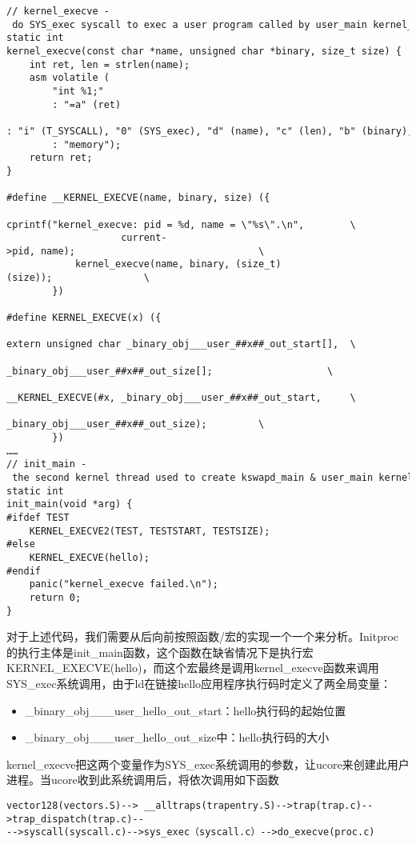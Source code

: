 \begin{lstlisting}
// kernel_execve - do SYS_exec syscall to exec a user program called by user_main kernel_thread
static int
kernel_execve(const char *name, unsigned char *binary, size_t size) {
    int ret, len = strlen(name);
    asm volatile (
        "int %1;"
        : "=a" (ret)
        : "i" (T_SYSCALL), "0" (SYS_exec), "d" (name), "c" (len), "b" (binary), "D" (size)
        : "memory");
    return ret;
}

#define __KERNEL_EXECVE(name, binary, size) ({                          \
            cprintf("kernel_execve: pid = %d, name = \"%s\".\n",        \
                    current->pid, name);                                \
            kernel_execve(name, binary, (size_t)(size));                \
        })

#define KERNEL_EXECVE(x) ({                                             \
            extern unsigned char _binary_obj___user_##x##_out_start[],  \
                _binary_obj___user_##x##_out_size[];                    \
            __KERNEL_EXECVE(#x, _binary_obj___user_##x##_out_start,     \
                            _binary_obj___user_##x##_out_size);         \
        })
……
// init_main - the second kernel thread used to create kswapd_main & user_main kernel threads
static int
init_main(void *arg) {
#ifdef TEST
    KERNEL_EXECVE2(TEST, TESTSTART, TESTSIZE);
#else
    KERNEL_EXECVE(hello);
#endif
    panic("kernel_execve failed.\n");
    return 0;
}
\end{lstlisting}

对于上述代码，我们需要从后向前按照函数/宏的实现一个一个来分析。Initproc的执行主体是init\_main函数，这个函数在缺省情况下是执行宏KERNEL\_EXECVE(hello)，而这个宏最终是调用kernel\_execve函数来调用SYS\_exec系统调用，由于ld在链接hello应用程序执行码时定义了两全局变量：

\begin{itemize}
\item
  \_binary\_obj\_\_\_user\_hello\_out\_start：hello执行码的起始位置
\item
  \_binary\_obj\_\_\_user\_hello\_out\_size中：hello执行码的大小
\end{itemize}

kernel\_execve把这两个变量作为SYS\_exec系统调用的参数，让ucore来创建此用户进程。当ucore收到此系统调用后，将依次调用如下函数

\begin{lstlisting}
vector128(vectors.S)--> __alltraps(trapentry.S)-->trap(trap.c)-->trap_dispatch(trap.c)--
-->syscall(syscall.c)-->sys_exec（syscall.c）-->do_execve(proc.c)
\end{lstlisting}

